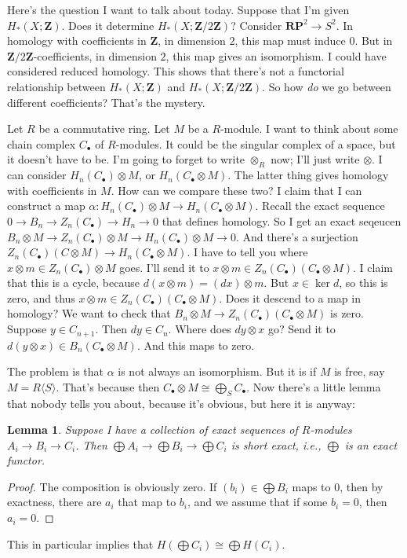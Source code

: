 \documentclass{amsart}
\theoremstyle{theorem}
\newtheorem{lemma}[theorem]{Lemma}
\theoremstyle{definition}
\newcommand{\RP}{\mathbf{RP}}
\newcommand{\Z}{\mathbf Z}
\begin{document}
Here's the question I want to talk about today. Suppose that I'm given $ H_\ast(X;\Z)$. Does it determine $ H_\ast(X;\Z/2\Z)$? Consider $\RP^2\to S^2$. In homology with coefficients in $\Z$, in dimension $2$, this map must induce $0$. But in $\Z/2\Z$-coefficients, in dimension $2$, this map gives an isomorphism. I could have considered reduced homology. This shows that there's not a functorial relationship between $ H_\ast(X;\Z)$ and $ H_\ast(X;\Z/2\Z)$. So how \emph{do} we go between different coefficients? That's the mystery.

Let $R$ be a commutative ring. Let $M$ be a $R$-module. I want to think about some chain complex $C_\bullet$ of $R$-modules. It could be the singular complex of a space, but it doesn't have to be. I'm going to forget to write $\otimes_R$ now; I'll just write $\otimes$. I can consider $ H_n(C_\bullet)\otimes M$, or $ H_n(C_\bullet\otimes M)$. The latter thing gives homology with coefficients in $M$. How can we compare these two? I claim that I can construct a map $\alpha: H_n(C_\bullet)\otimes M\to H_n(C_\bullet\otimes M)$. Recall the exact sequence $0\to B_n\to Z_n(C_\bullet)\to H_n\to 0$ that defines homology. So I get an exact seqeucen $B_n\otimes M\to Z_n(C_\bullet)\otimes M\to H_n(C_\bullet)\otimes M\to 0$. And there's a surjection $Z_n(C_\bullet)(C\otimes M)\to H_n(C_\bullet\otimes M)$. I have to tell you where $x\otimes m\in Z_n(C_\bullet)\otimes M$ goes. I'll send it to $x\otimes m\in Z_n(C_\bullet)(C_\bullet\otimes M)$. I claim that this is a cycle, because $d(x\otimes m)=(dx)\otimes m$. But $x\in\ker d$, so this is zero, and thus $x\otimes m\in Z_n(C_\bullet)(C_\bullet\otimes M)$. Does it descend to a map in homology? We want to check that $B_n\otimes M\to Z_n(C_\bullet)(C_\bullet\otimes M)$ is zero. Suppose $y\in C_{n+1}$. Then $dy\in C_n$. Where does $dy\otimes x$ go? Send it to $d(y\otimes x)\in B_n(C_\bullet\otimes M)$. And this maps to zero.

The problem is that $\alpha$ is not always an isomorphism. But it is if $M$ is free, say $M=R\langle S\rangle$. That's because then $C_\bullet\otimes M\cong\bigoplus_S C_\bullet$. Now there's a little lemma that nobody tells you about, because it's obvious, but here it is anyway:
\begin{lemma}
Suppose I have a collection of exact sequences of $R$-modules $A_i\to B_i\to C_i$. Then $\bigoplus A_i\to \bigoplus B_i\to \bigoplus C_i$ is short exact, i.e., $\bigoplus$ is an exact functor.
\end{lemma}
\begin{proof}
The composition is obviously zero. If $(b_i)\in\bigoplus B_i$ maps to $0$, then by exactness, there are $a_i$ that map to $b_i$, and we assume that if some $b_i=0$, then $a_i=0$.
\end{proof}
This in particular implies that $ H(\bigoplus C_i)\cong\bigoplus H(C_i)$.
\end{document}
